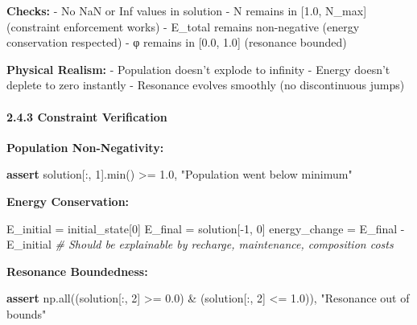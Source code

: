 \documentclass[
]{article}
\newenvironment{Shaded}{}{}
\newcommand{\BuiltInTok}[1]{\textcolor[rgb]{0.00,0.50,0.00}{#1}}
\newcommand{\CommentTok}[1]{\textcolor[rgb]{0.38,0.63,0.69}{\textit{#1}}}
\newcommand{\ControlFlowTok}[1]{\textcolor[rgb]{0.00,0.44,0.13}{\textbf{#1}}}
\newcommand{\DecValTok}[1]{\textcolor[rgb]{0.25,0.63,0.44}{#1}}
\newcommand{\FloatTok}[1]{\textcolor[rgb]{0.25,0.63,0.44}{#1}}
\newcommand{\NormalTok}[1]{#1}
\newcommand{\OperatorTok}[1]{\textcolor[rgb]{0.40,0.40,0.40}{#1}}
\newcommand{\StringTok}[1]{\textcolor[rgb]{0.25,0.44,0.63}{#1}}
\begin{document}
\textbf{Checks:} - No NaN or Inf values in solution - N remains in
{[}1.0, N\_max{]} (constraint enforcement works) - E\_total remains
non-negative (energy conservation respected) - φ remains in {[}0.0,
1.0{]} (resonance bounded)

\textbf{Physical Realism:} - Population doesn't explode to infinity -
Energy doesn't deplete to zero instantly - Resonance evolves smoothly
(no discontinuous jumps)

\paragraph{2.4.3 Constraint Verification}\label{constraint-verification}

\textbf{Population Non-Negativity:}

\begin{Shaded}
\begin{Highlighting}[]
\ControlFlowTok{assert}\NormalTok{ solution[:, }\DecValTok{1}\NormalTok{].}\BuiltInTok{min}\NormalTok{() }\OperatorTok{\textgreater{}=} \FloatTok{1.0}\NormalTok{, }\StringTok{"Population went below minimum"}
\end{Highlighting}
\end{Shaded}

\textbf{Energy Conservation:}

\begin{Shaded}
\begin{Highlighting}[]
\NormalTok{E\_initial }\OperatorTok{=}\NormalTok{ initial\_state[}\DecValTok{0}\NormalTok{]}
\NormalTok{E\_final }\OperatorTok{=}\NormalTok{ solution[}\OperatorTok{{-}}\DecValTok{1}\NormalTok{, }\DecValTok{0}\NormalTok{]}
\NormalTok{energy\_change }\OperatorTok{=}\NormalTok{ E\_final }\OperatorTok{{-}}\NormalTok{ E\_initial}
\CommentTok{\# Should be explainable by recharge, maintenance, composition costs}
\end{Highlighting}
\end{Shaded}

\textbf{Resonance Boundedness:}

\begin{Shaded}
\begin{Highlighting}[]
\ControlFlowTok{assert}\NormalTok{ np.}\BuiltInTok{all}\NormalTok{((solution[:, }\DecValTok{2}\NormalTok{] }\OperatorTok{\textgreater{}=} \FloatTok{0.0}\NormalTok{) }\OperatorTok{\&}\NormalTok{ (solution[:, }\DecValTok{2}\NormalTok{] }\OperatorTok{\textless{}=} \FloatTok{1.0}\NormalTok{)), }\StringTok{"Resonance out of bounds"}
\end{Highlighting}
\end{Shaded}
\end{document}
